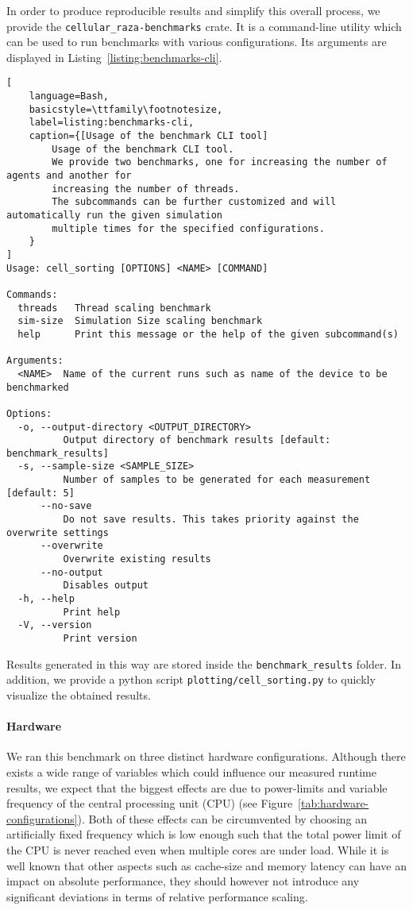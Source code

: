\documentclass[a4paper]{article}
\begin{document}
In order to produce reproducible results and simplify this overall process, we provide the
\texttt{cellular\_raza-benchmarks} crate.
It is a command-line utility which can be used to run benchmarks with various configurations.
Its arguments are displayed in Listing~\ref{listing:benchmarks-cli}.

\begin{minipage}{\linewidth}\begin{lstlisting}[
    language=Bash,
    basicstyle=\ttfamily\footnotesize,
    label=listing:benchmarks-cli,
    caption={[Usage of the benchmark CLI tool]
        Usage of the benchmark CLI tool.
        We provide two benchmarks, one for increasing the number of agents and another for
        increasing the number of threads.
        The subcommands can be further customized and will automatically run the given simulation
        multiple times for the specified configurations.
    }
]
Usage: cell_sorting [OPTIONS] <NAME> [COMMAND]

Commands:
  threads   Thread scaling benchmark
  sim-size  Simulation Size scaling benchmark
  help      Print this message or the help of the given subcommand(s)

Arguments:
  <NAME>  Name of the current runs such as name of the device to be benchmarked

Options:
  -o, --output-directory <OUTPUT_DIRECTORY>
          Output directory of benchmark results [default: benchmark_results]
  -s, --sample-size <SAMPLE_SIZE>
          Number of samples to be generated for each measurement [default: 5]
      --no-save
          Do not save results. This takes priority against the overwrite settings
      --overwrite
          Overwrite existing results
      --no-output
          Disables output
  -h, --help
          Print help
  -V, --version
          Print version
\end{lstlisting}\end{minipage}

Results generated in this way are stored inside the \texttt{benchmark\_results} folder.
In addition, we provide a python script \texttt{plotting/cell\_sorting.py} to quickly visualize
the obtained results.

\paragraph{Hardware}
We ran this benchmark on three distinct hardware configurations.
Although there exists a wide range of variables which could influence our measured runtime results,
we expect that the biggest effects are due to power-limits and variable frequency of the
central processing unit (CPU) (see Figure~\ref{tab:hardware-configurations}).
Both of these effects can be circumvented by choosing an artificially fixed frequency which is low
enough such that the total power limit of the CPU is never reached even when multiple cores are
under load.
While it is well known that other aspects such as cache-size and memory latency can have an impact
on absolute performance, they should however not introduce any significant deviations in terms of
relative performance scaling.
\end{document}
